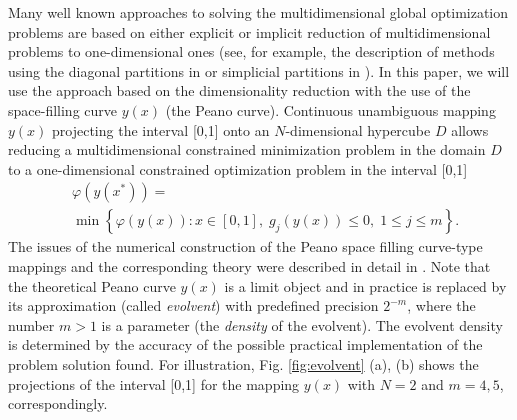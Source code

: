\documentclass[twocolumn]{svjour3}          %
\begin{document}
	Many well known approaches to solving the multidimensional global optimization problems are based on either explicit or implicit reduction of multidimensional problems to one-dimensional ones (see, for example, the description of methods using the diagonal partitions in \cite{Sergeyev2006} or simplicial partitions in \cite{Zilinskas2008}). In this paper, we will use the approach based on the dimensionality reduction with the use of the space-filling curve $y(x)$ (the Peano curve). Continuous unambiguous mapping $y(x)$ projecting the interval [0,1] onto an $N$-dimensional hypercube $D$ allows reducing a multidimensional constrained minimization problem in the domain $D$ to a one-dimensional constrained optimization problem in the interval [0,1]
\small
\begin{align}\label{one_dimensional_problem}
	& \varphi(y(x^\ast)) =  \nonumber \\
	& \min \left\{\varphi(y(x)): x \in [0,1], \; g_j(y(x))\leq 0, \; 1 \leq j \leq m\right\}.
\end{align}
\normalsize
The issues of the numerical construction of the Peano space filling curve-type mappings and the corresponding theory were described in detail in \cite{Strongin2000,Sergeyev2013}. Note that the theoretical Peano curve $y(x)$ is a limit object and in practice is replaced by its approximation (called \textit{evolvent}) with predefined precision $2^{-m}$, where the number $m>1$ is a parameter (the \textit{density} of the evolvent). The evolvent density is determined by the accuracy of the possible practical implementation of the problem solution found. For  illustration, Fig. \ref{fig:evolvent} (a), (b) shows the projections of the interval [0,1] for the mapping $y(x)$ with $N=2$ and $m=4,5$, correspondingly.
\end{document}
